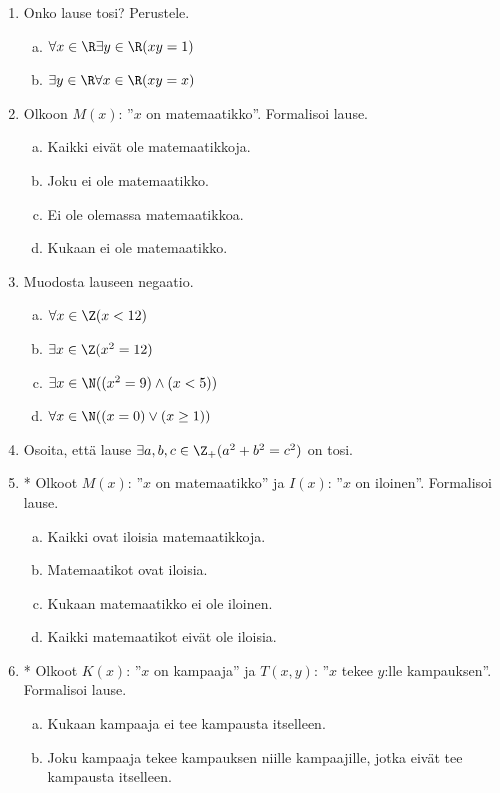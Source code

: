 \begin{enumerate}
\item Onko lause tosi? Perustele.
\begin{enumerate}[a)]
\item $\forall x\in \R\exists y\in \R (xy=1)$
\item $\exists y\in \R\forall x\in \R (xy =x)$
\end{enumerate}

\item Olkoon $M(x)$: ''$x$ on matemaatikko''. Formalisoi lause.

\begin{enumerate}[a)]
\item Kaikki eivät ole matemaatikkoja.
\item Joku ei ole matemaatikko.
\item Ei ole olemassa matemaatikkoa.
\item Kukaan ei ole matemaatikko.
\end{enumerate}

\item
Muodosta lauseen negaatio.
\begin{enumerate}[a)]
\item $\forall x\in \Z (x < 12)$
\item $\exists x\in \Z (x^2 = 12)$
\item $\exists x\in \N ((x^2=9) \land (x<5))$
\item $\forall x\in \N ((x=0)\lor (x\ge 1))$
\end{enumerate}

\item Osoita, että lause $\exists a, b, c \in \Z_{+} (a^2 + b^2 =
c^2)$ on tosi.

\item * %
Olkoot $M(x)$: ''$x$ on matemaatikko'' ja
$I(x)$: ''$x$ on iloinen''. Formalisoi lause.
\begin{enumerate}[a)]
\item Kaikki ovat iloisia matemaatikkoja.
\item Matemaatikot ovat iloisia.
\item Kukaan matemaatikko ei ole iloinen.
\item Kaikki matemaatikot eivät ole iloisia.
\end{enumerate}

\item * %
Olkoot $K(x)$: ''$x$ on kampaaja'' ja
$T(x, y)$: ''$x$ tekee $y$:lle kampauksen''. Formalisoi lause.
\begin{enumerate}[a)]
\item Kukaan kampaaja ei tee kampausta itselleen.
\item Joku kampaaja tekee kampauksen niille kampaajille,
jotka eivät tee kampausta itselleen.
\end{enumerate}

\end{enumerate}

